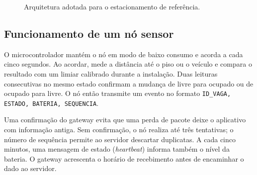 \documentclass[11pt,a4paper]{article}
\begin{document}
\begin{figure}[t]
\centering
{}
\caption{Arquitetura adotada para o estacionamento de referência.}
\label{fig:arquitetura}
\end{figure}

\subsection{Funcionamento de um nó sensor}
O microcontrolador mantém o nó em modo de baixo consumo e acorda a cada cinco segundos. Ao acordar, mede a distância até o piso ou o veículo e compara o resultado com um limiar calibrado durante a instalação. Duas leituras consecutivas no mesmo estado confirmam a mudança de livre para ocupado ou de ocupado para livre. O nó então transmite um evento no formato \texttt{ID\_VAGA, ESTADO, BATERIA, SEQUENCIA}.

Uma confirmação do gateway evita que uma perda de pacote deixe o aplicativo com informação antiga. Sem confirmação, o nó realiza até três tentativas; o número de sequência permite ao servidor descartar duplicatas. A cada cinco minutos, uma mensagem de estado (\textit{heartbeat}) informa também o nível da bateria. O gateway acrescenta o horário de recebimento antes de encaminhar o dado ao servidor.
\end{document}
